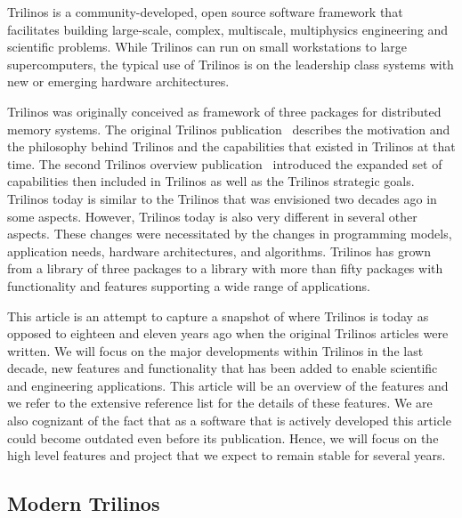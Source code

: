 


Trilinos is a community-developed, open source software framework that facilitates building large-scale, complex, multiscale, multiphysics engineering and scientific problems. While Trilinos can run on small workstations to large supercomputers, the typical use of Trilinos is on the leadership class systems with new or emerging hardware architectures.

Trilinos was originally conceived as framework of three packages for distributed memory systems. The original Trilinos publication~\cite{Heroux2005a} describes the motivation and the philosophy behind Trilinos and the capabilities that existed in Trilinos at that time. The second Trilinos overview publication~\cite{Heroux2012} introduced the expanded set of capabilities then included in Trilinos as well as the Trilinos strategic goals. Trilinos today is similar to the Trilinos that was envisioned two decades ago in some aspects. However, Trilinos today is also very different in several other aspects. These changes were necessitated by the changes in programming models, application needs, hardware architectures, and algorithms. Trilinos has grown from a library of three packages to a library with more than fifty packages with functionality and features supporting a wide range of applications.

This article is an attempt to capture a snapshot of where Trilinos is today as opposed to eighteen and eleven years ago when the original Trilinos articles were written. We will focus on the major developments within Trilinos in the last decade, new features and functionality that has been added to enable scientific and engineering applications. This article will be an overview of the features and we refer to the extensive reference list for the details of these features. We are also cognizant of the fact that as a software that is actively developed this article could become outdated even before its publication. Hence, we will focus on the high level features and project that we expect to remain stable for several years.



\subsection{Modern Trilinos}


